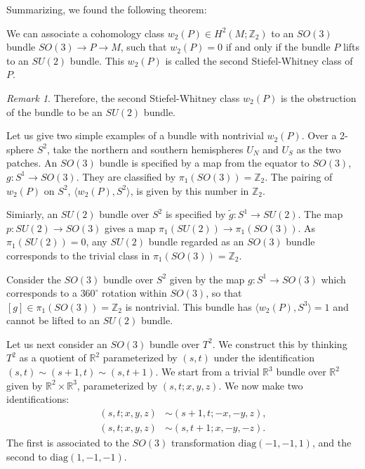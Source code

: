 \documentclass[12pt]{article}
\numberwithin{equation}{section}
\numberwithin{figure}{section}
\theoremstyle{remark}
\newtheorem{remark}[definition]{Remark}
\def\bR{\mathbb{R}}
\def\bZ{\mathbb{Z}}
\begin{document}
Summarizing, we found the following theorem:
\begin{theorem}
  We can associate a cohomology class $w_2(P)\in H^2(M;\bZ_2)$ to an $SO(3)$ bundle $SO(3)\to P\to M$,
  such that $w_2(P)=0$ if and only if the bundle $P$ lifts to an $SU(2)$ bundle.
  This $w_2(P)$ is called the second Stiefel-Whitney class of $P$.
\end{theorem}

\begin{remark}
  Therefore, the second Stiefel-Whitney class $w_2(P)$ is the obstruction of the bundle to be an $SU(2)$ bundle.
\end{remark}

Let us give two simple examples of a bundle with nontrivial $w_2(P)$.
Over a 2-sphere $S^2$, take the northern and southern hemispheres $U_N$ and $U_S$ as the two patches.
An $SO(3)$ bundle is specified by a map from the equator to $SO(3)$, $g:S^1\to SO(3)$. 
They are classified by $\pi_1(SO(3))=\bZ_2$.
The pairing of $w_2(P)$ on $S^2$, $\langle w_2(P),S^2\rangle$, is given by this number in $\bZ_2$.

Simiarly, an $SU(2)$ bundle over $S^2$ is specified by $\tilde g: S^1\to SU(2)$.
The map $p:SU(2)\to SO(3)$ gives a map $\pi_1(SU(2))\to \pi_1(SO(3))$.
As $\pi_1(SU(2))=0$,
any $SU(2)$ bundle regarded as an $SO(3)$ bundle 
corresponds to the trivial class in $\pi_1(SO(3))=\bZ_2$.

\begin{example}
Consider the $SO(3)$ bundle over $S^2$ given by 
the map $g: S^1\to SO(3)$ which corresponds to a $360^\circ$ rotation within $SO(3)$, so that $[g]\in \pi_1(SO(3))=\bZ_2$ is nontrivial.
This bundle has $\langle w_2(P),S^3\rangle=1$ and cannot be lifted to an $SU(2)$ bundle.
\end{example}

Let us next consider an $SO(3)$ bundle over $T^2$.
We construct this by thinking $T^2$ as a quotient of $\bR^2$ parameterized by $(s,t)$ under the identification $(s,t)\sim (s+1,t)\sim (s,t+1)$.
We start from a trivial $\bR^3$ bundle over $\bR^2$ given by
$\bR^2\times \bR^3$, parameterized by $(s,t;x,y,z)$.
We now make two identifications:
\begin{align}
  (s,t;x,y,z) &\sim (s+1,t;-x,-y,z),\label{eq:SO3foo}\\
  (s,t;x,y,z) &\sim (s,t+1;x,-y,-z).\label{eq:SO3bar}
\end{align}
The first is associated to the $SO(3)$ transformation $\mathrm{diag}(-1,-1,1)$,
and the second to $\mathrm{diag}(1,-1,-1)$.
\end{document}
